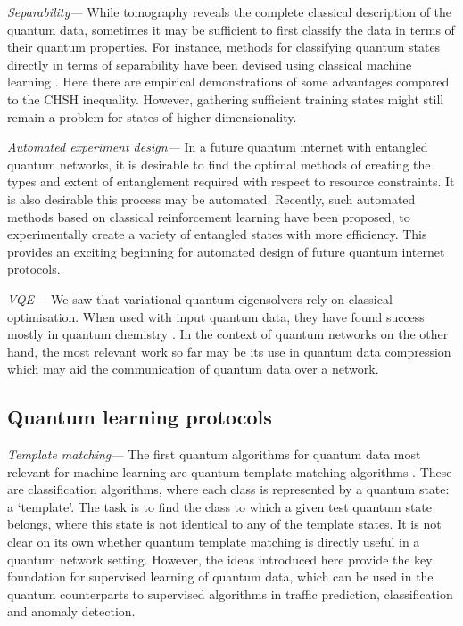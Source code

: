 \documentclass[twocolumn, aps, rmp, amsmath, amssymb, nofootinbib, superscriptaddress, longbibliography, floatfix, table-of-contents, eqsecnum]{revtex4-2}
\begin{document}
\textit{Separability---} While tomography reveals the complete classical description of the quantum data, sometimes it may be sufficient to first classify the data in terms of their quantum properties. For instance, methods for classifying quantum states directly in terms of separability have been devised using classical machine learning \cite{Ma2017, Su2017, Gao2018}. Here there are empirical demonstrations of some advantages compared to the CHSH inequality. However, gathering sufficient training states might still remain a problem for states of higher dimensionality.

\textit{Automated experiment design---} In a future quantum internet with entangled quantum networks, it is desirable to find the optimal methods of creating the types and extent of entanglement required with respect to resource constraints. It is also desirable this process may be automated. Recently, such automated methods based on classical reinforcement learning \cite{alexey} have been proposed, to experimentally create a variety of entangled states with more efficiency. This provides an exciting beginning for automated design of future quantum internet protocols. 

\textit{VQE---} We saw that variational quantum eigensolvers rely on classical optimisation. When used with input quantum data, they have found success mostly in quantum chemistry \cite{peruzzo2014peruzzo, moll2018quantum}. In the context of quantum networks on the other hand, the most relevant work so far may be its use in quantum data compression \cite{jonromero} which may aid the communication of quantum data over a network. 

\subsection{Quantum learning protocols}
\textit{Template matching---} The first quantum algorithms for quantum data most relevant for machine learning are quantum template matching algorithms \cite{saski1, sasaki2}. These are classification algorithms, where each class is represented by a quantum state: a `template'. The task is to find the class to which a given test quantum state belongs, where this state is not identical to any of the template states. It is not clear on its own whether quantum template matching is directly useful in a quantum network setting. However, the ideas introduced here provide the key foundation for supervised learning of quantum data, which can be used in the quantum counterparts to supervised algorithms in traffic prediction, classification and anomaly detection.
\end{document}
